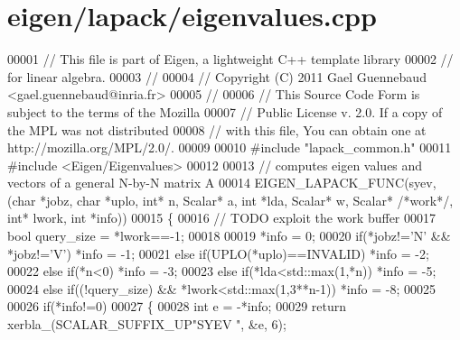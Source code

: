 \hypertarget{eigen_2lapack_2eigenvalues_8cpp_source}{}\section{eigen/lapack/eigenvalues.cpp}
\label{eigen_2lapack_2eigenvalues_8cpp_source}

\begin{DoxyCode}
00001 \textcolor{comment}{// This file is part of Eigen, a lightweight C++ template library}
00002 \textcolor{comment}{// for linear algebra.}
00003 \textcolor{comment}{//}
00004 \textcolor{comment}{// Copyright (C) 2011 Gael Guennebaud <gael.guennebaud@inria.fr>}
00005 \textcolor{comment}{//}
00006 \textcolor{comment}{// This Source Code Form is subject to the terms of the Mozilla}
00007 \textcolor{comment}{// Public License v. 2.0. If a copy of the MPL was not distributed}
00008 \textcolor{comment}{// with this file, You can obtain one at http://mozilla.org/MPL/2.0/.}
00009 
00010 \textcolor{preprocessor}{#include "lapack\_common.h"}
00011 \textcolor{preprocessor}{#include <Eigen/Eigenvalues>}
00012 
00013 \textcolor{comment}{// computes eigen values and vectors of a general N-by-N matrix A}
00014 EIGEN\_LAPACK\_FUNC(syev,(\textcolor{keywordtype}{char} *jobz, \textcolor{keywordtype}{char} *uplo, \textcolor{keywordtype}{int}* n, Scalar* a, \textcolor{keywordtype}{int} *lda, Scalar* w, Scalar* \textcolor{comment}{/*work*/}, \textcolor{keywordtype}{
      int}* lwork, \textcolor{keywordtype}{int} *info))
00015 \{
00016   \textcolor{comment}{// TODO exploit the work buffer}
00017   \textcolor{keywordtype}{bool} query\_size = *lwork==-1;
00018   
00019   *info = 0;
00020         \textcolor{keywordflow}{if}(*jobz!=\textcolor{charliteral}{'N'} && *jobz!=\textcolor{charliteral}{'V'})                    *info = -1;
00021   \textcolor{keywordflow}{else}  \textcolor{keywordflow}{if}(UPLO(*uplo)==INVALID)                        *info = -2;
00022   \textcolor{keywordflow}{else}  \textcolor{keywordflow}{if}(*n<0)                                        *info = -3;
00023   \textcolor{keywordflow}{else}  \textcolor{keywordflow}{if}(*lda<std::max(1,*n))                         *info = -5;
00024   \textcolor{keywordflow}{else}  \textcolor{keywordflow}{if}((!query\_size) && *lwork<std::max(1,3**n-1))  *info = -8;
00025     
00026   \textcolor{keywordflow}{if}(*info!=0)
00027   \{
00028     \textcolor{keywordtype}{int} e = -*info;
00029     \textcolor{keywordflow}{return} xerbla\_(SCALAR\_SUFFIX\_UP\textcolor{stringliteral}{"SYEV "}, &e, 6);

\end{DoxyCode}
